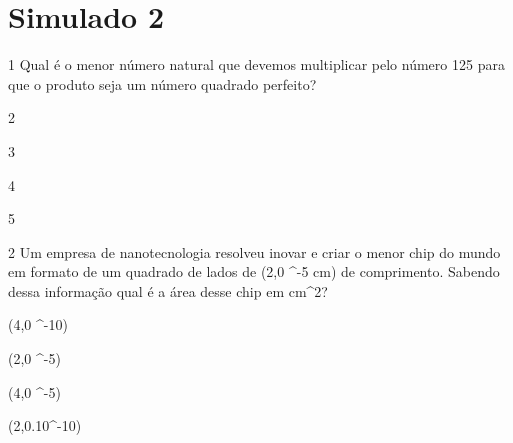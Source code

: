 






\section*{Simulado 2}

\num{1} Qual é o menor número natural que devemos multiplicar pelo número 125
para que o produto seja um número quadrado perfeito?
\item 2
\item 3
\item 4
\item 5







\num{2} Um empresa de nanotecnologia resolveu inovar e criar o menor chip do
mundo em formato de um quadrado de lados de (2,0  ^{-5 cm}) de
comprimento. Sabendo dessa informação qual é a área desse chip em cm^2?
\item (4,0 ^{-10})
\item (2,0 ^{-5})
\item (4,0 ^{-5})
\item (2,0.10^{-10})


